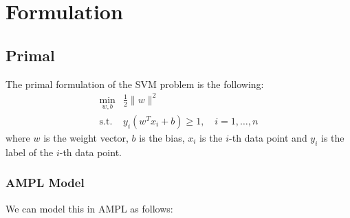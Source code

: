 \chapter{Formulation}

\section{Primal}

The primal formulation of the SVM problem is the following:
\begin{align*}
\min_{w,b} & \frac{1}{2} \|w\|^2 \\
\text{s.t.} & y_i(w^Tx_i + b) \geq 1, \quad i = 1, \ldots, n
\end{align*}
where $w$ is the weight vector, $b$ is the bias, $x_i$ is the $i$-th data point
and $y_i$ is the label of the $i$-th data point.

\subsection{AMPL Model}

We can model this in AMPL as follows:

\inputminted{ampl}{../ampl/primal.ampl}

